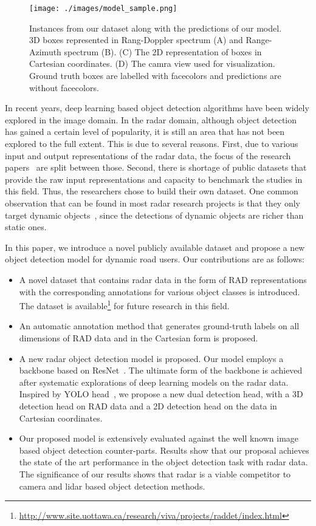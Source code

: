 \documentclass[10pt, conference, compsocconf]{IEEEtran}
\begin{document}
\begin{figure}[!t]
	\centering
	\texttt{[image: ./images/model\_sample.png]}
	\caption{Instances from our dataset along with the predictions of our model. 3D boxes represented in Rang-Doppler spectrum (A) and Range-Azimuth spectrum (B). (C) The 2D representation of boxes in Cartesian coordinates. (D) The camra view used for visualization. Ground truth boxes are labelled with facecolors and predictions are without facecolors.}
	\label{F:DatasetSample}
\end{figure}


In recent years, deep learning based object detection algorithms have been widely explored in the image domain. In the radar domain, although object detection has gained a certain level of popularity, it is still an area that has not been explored to the full extent. This is due to several reasons. First, due to various input and output representations of the radar data, the focus of the research papers~\cite{Ref:ProbabilisticOriented, Ref:DeepRadarDetector, Ref:3DRadarCube, Ref:ClusterSegmentation} are split between those. Second, there is shortage of public datasets that provide the raw input representations and capacity to benchmark the studies in this field. Thus, the researchers chose to build their own dataset. 
One common observation that can be found in most radar research projects is that they only target dynamic objects~\cite{Ref:ProbabilisticOriented, Ref:3DRadarCube}, since the detections of dynamic objects are richer than static ones.


In this paper, we introduce a novel publicly available dataset and propose a new object detection model for dynamic road users. Our contributions are as follows:

\begin{itemize}
	\item A novel dataset that contains radar data in the form of RAD representations with the corresponding annotations for various object classes is introduced. The dataset is available\footnote{\label{webpage}\url{http://www.site.uottawa.ca/research/viva/projects/raddet/index.html}} for future research in this field. 
	\item An automatic annotation method that generates ground-truth labels on all dimensions of RAD data and in the Cartesian form is proposed. 	
	\item A new radar object detection model is proposed. Our model employs a backbone based on ResNet~\cite{BG:ResNet}. The ultimate form of the backbone is achieved after systematic explorations of deep learning models on the radar data. Inspired by YOLO head~\cite{Ref:YOLOv4}, we propose a new dual detection head, with a 3D detection head on RAD data and a 2D detection head on the data in Cartesian coordinates.	
	\item Our proposed model is extensively evaluated against the well known image based object detection counter-parts. Results show that our proposal achieves the state of the art performance in the object detection task with radar data. The significance of our results shows that radar is a viable competitor to camera and lidar based object detection methods.
\end{itemize}
\end{document}
